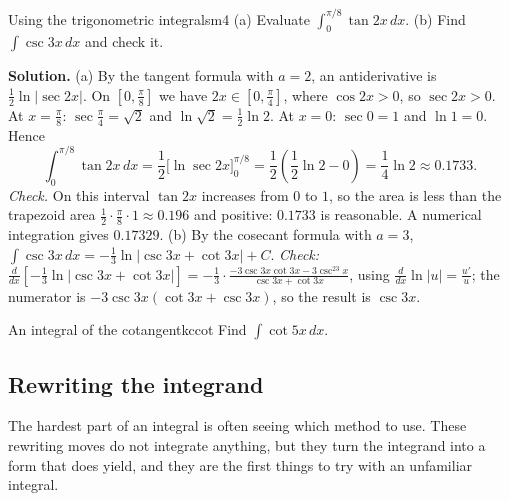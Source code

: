 \documentclass[11pt]{article}
\begin{document}

\begin{exmp}{Using the trigonometric integrals}{m4}
(a) Evaluate $\int_0^{\pi/8}\tan2x\,dx$. (b) Find $\int\csc3x\,dx$ and check it.

\textbf{Solution.} (a) By the tangent formula with $a=2$, an antiderivative is $\frac12\ln\lvert\sec2x\rvert$. On $\left[0,\frac\pi8\right]$ we have $2x\in\left[0,\frac\pi4\right]$, where $\cos2x>0$, so $\sec2x>0$. At $x=\frac\pi8$: $\sec\frac\pi4=\sqrt2$ and $\ln\sqrt2=\frac12\ln2$. At $x=0$: $\sec0=1$ and $\ln1=0$. Hence
\[\int_0^{\pi/8}\tan2x\,dx=\frac12\Big[\ln\sec2x\Big]_0^{\pi/8}=\frac12\left(\frac12\ln2-0\right)=\frac14\ln2\approx0.1733 .\]
\emph{Check.} On this interval $\tan2x$ increases from $0$ to $1$, so the area is less than the trapezoid area $\frac12\cdot\frac\pi8\cdot1\approx0.196$ and positive: $0.1733$ is reasonable. A numerical integration gives $0.17329$.
(b) By the cosecant formula with $a=3$, $\int\csc3x\,dx=-\frac13\ln\lvert\csc3x+\cot3x\rvert+C$. \emph{Check:} $\frac{d}{dx}\left[-\frac13\ln\lvert\csc3x+\cot3x\rvert\right]=-\frac13\cdot\frac{-3\csc3x\cot3x-3\csc^23x}{\csc3x+\cot3x}$, using $\frac{d}{dx}\ln\lvert u\rvert=\frac{u'}u$; the numerator is $-3\csc3x(\cot3x+\csc3x)$, so the result is $\csc3x$.
\end{exmp}

\begin{kc}{An integral of the cotangent}{kccot}
Find $\int\cot5x\,dx$.
\end{kc}

\subsection*{Rewriting the integrand}

The hardest part of an integral is often seeing which method to use. These rewriting moves do not integrate anything, but they turn the integrand into a form that does yield, and they are the first things to try with an unfamiliar integral.
\end{document}
